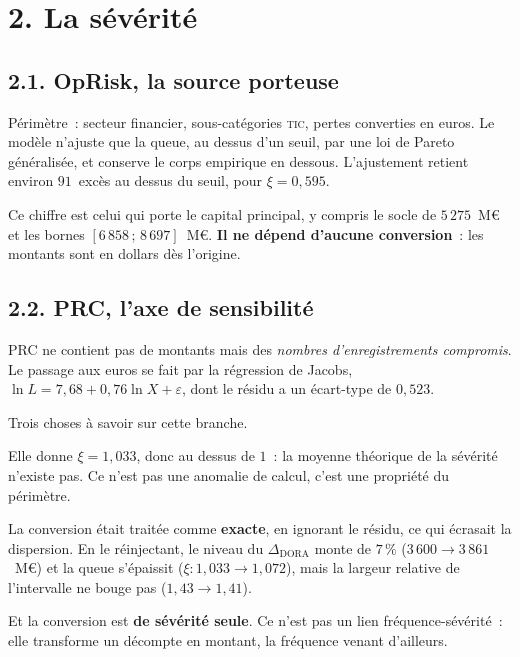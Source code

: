 \documentclass[11pt,a4paper]{article}
\begin{document}
\section*{2. La sévérité}

\subsection*{2.1. OpRisk, la source porteuse}

Périmètre~: secteur financier, sous-catégories \textsc{tic}, pertes converties en euros.
Le modèle n'ajuste que la queue, au dessus d'un seuil, par une loi de Pareto généralisée,
et conserve le corps empirique en dessous. L'ajustement retient environ $91$~excès au dessus
du seuil, pour $\xi=0{,}595$.

Ce chiffre est celui qui porte le capital principal, y compris le socle de $5\,275$~M\euro{}
et les bornes $[6\,858\,;\,8\,697]$~M\euro. \textbf{Il ne dépend d'aucune conversion}~: les
montants sont en dollars dès l'origine.

\subsection*{2.2. PRC, l'axe de sensibilité}

PRC ne contient pas de montants mais des \emph{nombres d'enregistrements compromis}. Le
passage aux euros se fait par la régression de Jacobs,
$\ln L = 7{,}68+0{,}76\ln X+\varepsilon$, dont le résidu a un écart-type de $0{,}523$.

Trois choses à savoir sur cette branche.

Elle donne $\xi=1{,}033$, donc au dessus de $1$~: la moyenne théorique de la sévérité
n'existe pas. Ce n'est pas une anomalie de calcul, c'est une propriété du périmètre.

La conversion était traitée comme \textbf{exacte}, en ignorant le résidu, ce qui écrasait la
dispersion. En le réinjectant, le niveau du $\Delta_{\text{DORA}}$ monte de $7\,\%$
($3\,600 \to 3\,861$~M\euro) et la queue s'épaissit ($\xi : 1{,}033 \to 1{,}072$), mais la
largeur relative de l'intervalle ne bouge pas ($1{,}43 \to 1{,}41$).

Et la conversion est \textbf{de sévérité seule}. Ce n'est pas un lien fréquence-sévérité~:
elle transforme un décompte en montant, la fréquence venant d'ailleurs.

\end{document}
